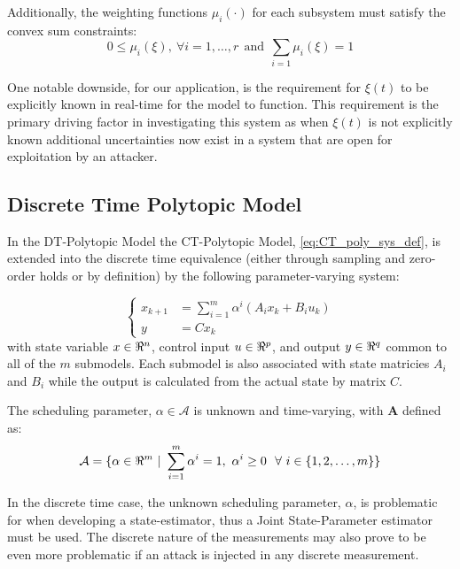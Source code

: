 \documentclass[]{article}
\begin{document}
Additionally, the weighting functions $\mu_i (\cdot)$ for each subsystem must satisfy the convex sum constraints:
\begin{equation}\label{eq:convex_sum_constraints}
	0 \leq \mu_i(\xi), \ \forall i = 1,\dots,r \ \ \text{and} \ \ \sum_{i=1} \mu_i(\xi) = 1
\end{equation}


One notable downside, for our application, is the requirement for $\xi(t)$ to be explicitly known in real-time for the model to function. This requirement is the primary driving factor in investigating this system as when $\xi(t)$ is not explicitly known additional uncertainties now exist in a system that are open for exploitation by an attacker.


\subsection{Discrete Time Polytopic Model}
In the DT-Polytopic Model the CT-Polytopic Model, \eqref{eq:CT_poly_sys_def}, is extended into the discrete time equivalence (either through sampling and zero-order holds or by definition) by the following parameter-varying system:

\begin{equation}\label{eq:DT_poly_sys_def}
	\begin{cases}
		x_{k+1} &= \sum_{i=1}^{m} \alpha^i (A_i x_k + B_i u_k)\\
		y		&= C x_k
	\end{cases}
\end{equation}
with state variable $x \in \real^n$, control input $u \in \real^p$, and output $y \in \real^q$ common to all of the $m$ submodels. Each submodel is also associated with state matricies $A_i$ and $B_i$ while the output is calculated from the actual state by matrix $C$.

The scheduling parameter, $\alpha \in \mathcal{A}$ is unknown and time-varying, with $\mathbf{A}$ defined as:
\begin{equation}\label{eq:alpha_set}
	\mathcal{A} = \{\alpha\in \real^m \ | \ \sum_{i=1}^m \alpha^i = 1, \ \alpha^i \geq 0 \ \ \forall \ i \in \{1,2,\dots,m\}\}
\end{equation}

In the discrete time case, the unknown scheduling parameter, $\alpha$, is problematic for when developing a state-estimator, thus a Joint State-Parameter estimator must be used. The discrete nature of the measurements may also prove to be even more problematic if an attack is injected in any discrete measurement.
\end{document}
